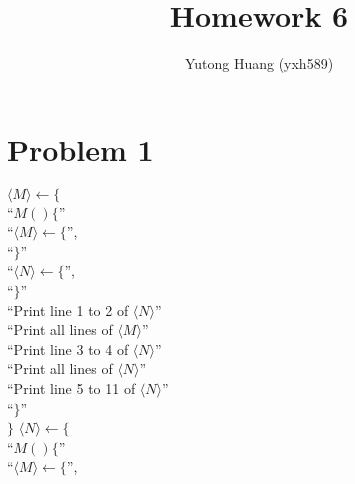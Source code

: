 \documentclass[letterpaper]{article}
\title{\vspace{-2cm}Homework 6}
\author{Yutong Huang (yxh589)}
\date{}
\begin{document}
\maketitle
\section*{Problem 1}
\begin{multicols}{2}
    \begin{minipage}{0.4\textwidth}
        \begin{algorithm}[H]
            \caption{$M()$}
            $ \langle M \rangle \gets \{$\\
            \nl \hspace{0.5cm}``$M()\{$''\\
            \nl \hspace{1.0cm}``$ \langle M \rangle \gets \{$'',\\
            \nl \hspace{1.0cm}``$\}$''\\
            \nl \hspace{1.0cm}``$ \langle N \rangle \gets \{$'',\\
            \nl \hspace{1.0cm}``$\}$''\\
            \nl \hspace{1.0cm}``Print line 1 to 2 of $\langle N \rangle$''\\
            \nl \hspace{1.0cm}``Print all lines of $\langle M \rangle$''\\
            \nl \hspace{1.0cm}``Print line 3 to 4 of $\langle N \rangle$''\\
            \nl \hspace{1.0cm}``Print all lines of $\langle N \rangle$''\\
            \nl \hspace{1.0cm}``Print line 5 to 11 of $\langle N \rangle$''\\
            \nl \hspace{0.5cm}``$\}$''\\
            $ \}$\;
            \setcounter{AlgoLine}{0}
            $ \langle N \rangle \gets \{$\\
            \nl \hspace{0.5cm}``$M()\{$''\\
            \nl \hspace{1.0cm}``$ \langle M \rangle \gets \{$'',\\

\end{algorithm}
\end{minipage}
\end{multicols}
\end{document}
